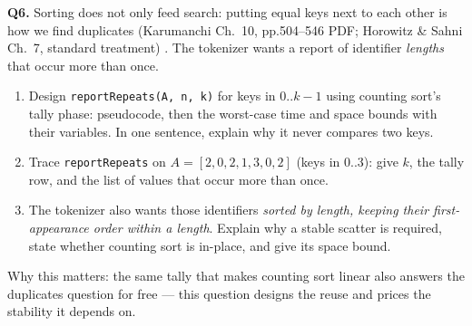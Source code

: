 \documentclass[11pt]{article}
\begin{document}
\textbf{Q6.} Sorting does not only feed search: putting equal keys next to each other is how we find duplicates (Karumanchi Ch.~10, pp.504--546 PDF; Horowitz \& Sahni Ch.~7, standard treatment) \cite{Karumanchi2017_data_structures_algorithms_made_easy,HorowitzSahni2008_fundamentals_data_structures}. The tokenizer wants a report of identifier \emph{lengths} that occur more than once.
\begin{enumerate}
  \item[(a)] Design \texttt{reportRepeats(A, n, k)} for keys in $0..k-1$ using counting sort's tally phase: pseudocode, then the worst-case time and space bounds with their variables. In one sentence, explain why it never compares two keys.
  \item[(b)] Trace \texttt{reportRepeats} on $A = [2, 0, 2, 1, 3, 0, 2]$ (keys in $0..3$): give $k$, the tally row, and the list of values that occur more than once.
  \item[(c)] The tokenizer also wants those identifiers \emph{sorted by length, keeping their first-appearance order within a length}. Explain why a stable scatter is required, state whether counting sort is in-place, and give its space bound.
\end{enumerate}
Why this matters: the same tally that makes counting sort linear also answers the duplicates question for free --- this question designs the reuse and prices the stability it depends on.



\end{document}
